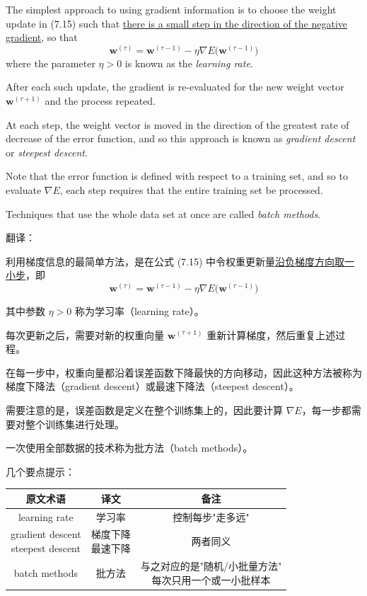 \documentclass{article}
\begin{document}
The simplest approach to using gradient information is to choose the weight update in (7.15) such that \underline{there is a small step in the direction of the negative gradient}, so that
\begin{equation}
\mathbf{w}^{(\tau)} = \mathbf{w}^{(\tau-1)} - \eta \nabla E\bigl(\mathbf{w}^{(\tau-1)}\bigr)
\tag{7.16}
\end{equation}
where the parameter $\eta > 0$ is known as the \emph{learning rate}. 

After each such update, the gradient is re-evaluated for the new weight vector $\mathbf{w}^{(\tau+1)}$ and the process repeated. 

At each step, the weight vector is moved in the direction of the greatest rate of decrease of the error function, and so this approach is known as \emph{gradient descent} or \emph{steepest descent}. 

Note that the error function is defined with respect to a training set, and so to evaluate $\nabla E$, each step requires that the entire training set be processed. 

Techniques that use the whole data set at once are called \emph{batch methods}.

{\color{red}
翻译：

利用梯度信息的最简单方法，是在公式 (7.15) 中令权重更新量\underline{沿负梯度方向取一小步}，即
$$\mathbf{w}^{(\tau)} = \mathbf{w}^{(\tau-1)} - \eta \nabla E\bigl(\mathbf{w}^{(\tau-1)}\bigr)$$

其中参数 $\eta > 0$ 称为学习率（learning rate）。

每次更新之后，需要对新的权重向量 $\mathbf{w}^{(\tau+1)}$ 重新计算梯度，然后重复上述过程。

在每一步中，权重向量都沿着误差函数下降最快的方向移动，因此这种方法被称为梯度下降法（gradient descent）或最速下降法（steepest descent）。

需要注意的是，误差函数是定义在整个训练集上的，因此要计算 $\nabla E$，每一步都需要对整个训练集进行处理。

一次使用全部数据的技术称为批方法（batch methods）。
}

{\color{blue}
几个要点提示：
\begin{table}[htbp]
\centering
\renewcommand{\arraystretch}{1.8}   %
\color{blue}
\begin{tabular}{|c|c|c|}\hline 
原文术语 & 译文 & 备注 \\ \hline 
learning rate & 学习率 & 控制每步"走多远" \\ \hline 
\makecell{gradient descent \\ steepest descent} & \makecell{梯度下降 \\ 最速下降} & 两者同义 \\ \hline 
batch methods & 批方法 & \makecell{与之对应的是"随机/小批量方法"\\ 每次只用一个或一小批样本 } \\ \hline 
\end{tabular}
\end{table}


}
\end{document}
